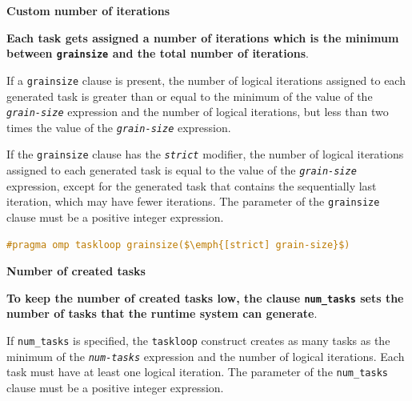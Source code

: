 \begin{flushleft}
    \textcolor{Green3}{ \textbf{Custom number of iterations}}
\end{flushleft}
\textbf{Each task gets assigned a number of iterations which is the minimum between \texttt{grainsize} and the total number of iterations}.

\highspace
If a \texttt{grainsize} clause is present, the number of logical iterations assigned to each generated task is greater than or equal to the minimum of the value of the \texttt{\emph{grain-size}} expression and the number of logical iterations, but less than two times the value of the \texttt{\emph{grain-size}} expression.

\highspace
If the \texttt{grainsize} clause has the \texttt{\emph{strict}} modifier, the number of logical iterations assigned to each generated task is equal to the value of the \texttt{\emph{grain-size}} expression, except for the generated task that contains the sequentially last iteration, which may have fewer iterations. The parameter of the \texttt{grainsize} clause must be a positive integer expression.
\begin{openmpbox}
    \begin{lstlisting}[language=C++, mathescape=true]
#pragma omp taskloop grainsize($\emph{[strict] grain-size}$)\end{lstlisting}
\end{openmpbox}

\newpage

\begin{flushleft}
    \textcolor{Green3}{ \textbf{Number of created tasks}}
\end{flushleft}
\textbf{To keep the number of created tasks low, the clause \texttt{num\_tasks} sets the number of tasks that the runtime system can generate}.

\highspace
If \texttt{num\_tasks} is specified, the \texttt{taskloop} construct creates as many tasks as the minimum of the \texttt{\emph{num-tasks}} expression and the number of logical iterations. Each task must have at least one logical iteration. The parameter of the \texttt{num\_tasks} clause must be a positive integer expression.

